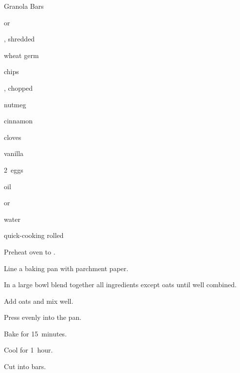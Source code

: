 \begin{recipe}{Granola Bars}{}{}

\begin{ingredients}
\item \C{\half}  or 
\item \C{\half} , shredded 
\item \C{\quarter} wheat germ
\item \C{\quarter}  chips
\item \C{\quarter} , chopped
\item \tp{\half} nutmeg 
\item \tp{\half} cinnamon 
\item \tp{\half} cloves 
\item \tp{\half}  
\item {} vanilla 
\item 2~eggs
\item \C{\twothird} 
\item {} oil
\item {}  or 
\item \C{\half} water
\item {} quick-cooking rolled 
\end{ingredients}

\begin{directions}
\item Preheat oven to . 
\item Line a  baking pan with parchment paper.
\item In a large bowl blend together all ingredients except oats until well combined.
\item Add oats and mix well.
\item Press evenly into the pan.
\item Bake for 15~minutes.
\item Cool for 1~hour. 
\item Cut into bars. 
\end{directions}

\end{recipe}

